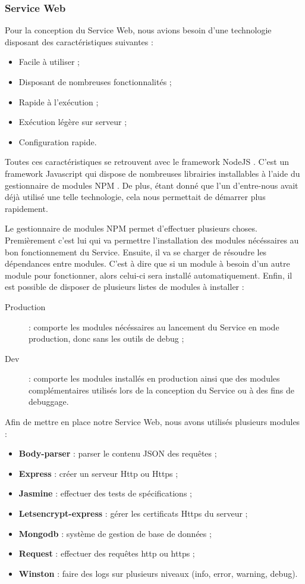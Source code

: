 \subsubsection{Service Web}

Pour la conception du Service Web, nous avions besoin d'une technologie disposant des caractéristiques suivantes :
\begin{itemize}
    \item Facile à utiliser ;
    \item Disposant de nombreuses fonctionnalités ;
    \item Rapide à l'exécution ;
    \item Exécution légère sur serveur ;
    \item Configuration rapide.
\end{itemize}

Toutes ces caractéristiques se retrouvent avec le framework NodeJS \cite{nodejs}. C'est un framework Javascript qui dispose de nombreuses librairies installables à l'aide du gestionnaire de modules NPM \cite{npmjs}. De plus, étant donné que l'un d'entre-nous avait déjà utilisé une telle technologie, cela nous permettait de démarrer plus rapidement.

Le gestionnaire de modules NPM permet d'effectuer plusieurs choses.
Premièrement c'est lui qui va permettre l'installation des modules nécéssaires au bon fonctionnement du Service. Ensuite, il va se charger de résoudre les dépendances entre modules. C'est à dire que si un module à besoin d'un autre module pour fonctionner, alors celui-ci sera installé automatiquement.
Enfin, il est possible de disposer de plusieurs listes de modules à installer :
\begin{description}
    \item [Production] : comporte les modules nécéssaires au lancement du Service en mode production, donc sans les outils de debug ;
    \item [Dev] : comporte les modules installés en production ainsi que des modules complémentaires utilisés lors de la conception du Service ou à des fins de debuggage.
\end{description}

Afin de mettre en place notre Service Web, nous avons utilisés plusieurs modules :
\begin{itemize}
    \item \textbf{Body-parser} : parser le contenu JSON des requêtes ;
    \item \textbf{Express} : créer un serveur Http ou Https ;
    \item \textbf{Jasmine} : effectuer des tests de spécifications ;
    \item \textbf{Letsencrypt-express} : gérer les certificats Https du serveur ;
    \item \textbf{Mongodb} : système de gestion de base de données ;
    \item \textbf{Request} : effectuer des requêtes http ou https ;
    \item \textbf{Winston} : faire des logs sur plusieurs niveaux (info, error, warning, debug).
\end{itemize}

